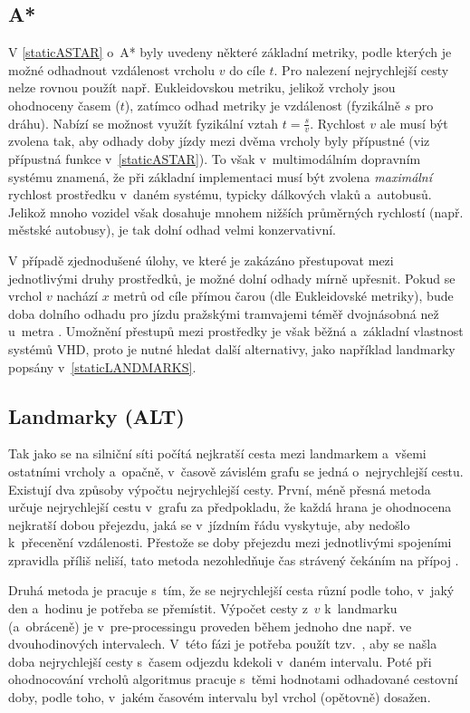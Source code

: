 \subsection{A* }
V \autoref{staticASTAR} o~A* byly uvedeny některé základní metriky, podle kterých je možné odhadnout vzdálenost vrcholu $v$ do cíle $t$. Pro nalezení nejrychlejší cesty nelze rovnou použít např. Eukleidovskou metriku, jelikož vrcholy jsou ohodnoceny časem (\(t\)), zatímco odhad metriky je vzdálenost (fyzikálně \(s\) pro dráhu). Nabízí se možnost využít fyzikální vztah $t = \frac{s}{v}$. Rychlost \(v\) ale musí být zvolena tak, aby odhady doby jízdy mezi dvěma vrcholy byly přípustné (viz přípustná funkce v~\autoref{staticASTAR}). To však v~multimodálním dopravním systému znamená, že při základní implementaci musí být zvolena \emph{maximální} rychlost prostředku v~daném systému, typicky dálkových vlaků a~autobusů. Jelikož mnoho vozidel však dosahuje mnohem nižších průměrných rychlostí (např. městské autobusy), je tak dolní odhad velmi konzervativní.

\renewcommand{\subsectionautorefname}{pododdíle}
V případě zjednodušené úlohy, ve které je zakázáno přestupovat mezi jednotlivými druhy prostředků, je možné dolní odhady mírně upřesnit. Pokud se vrchol $v$ nachází $x$ metrů od cíle přímou čarou (dle Eukleidovské metriky), bude doba dolního odhadu pro jízdu pražskými tramvajemi téměř dvojnásobná než u~metra \cite{DPPvDatech}. Umožnění přestupů mezi prostředky je však běžná a~základní vlastnost systémů VHD, proto je nutné hledat další alternativy, jako například landmarky popsány v~\autoref{staticLANDMARKS}.
\renewcommand{\subsectionautorefname}{pododdíl}

\subsection{Landmarky (ALT)}
Tak jako se na silniční síti počítá nejkratší cesta mezi landmarkem a~všemi ostatními vrcholy a~opačně, v~časově závislém grafu se jedná o~nejrychlejší cestu. Existují dva způsoby výpočtu nejrychlejší cesty. První, méně přesná metoda určuje nejrychlejší cestu v~grafu za předpokladu, že každá hrana je ohodnocena nejkratší dobou přejezdu, jaká se v~jízdním řádu vyskytuje, aby nedošlo k~přecenění vzdálenosti. Přestože se doby přejezdu mezi jednotlivými spojeními zpravidla příliš neliší, tato metoda nezohledňuje čas strávený čekáním na přípoj \cite{dellingLandmarkRouting}.

Druhá metoda je pracuje s~tím, že se nejrychlejší cesta různí podle toho, v~jaký den a~hodinu je potřeba se přemístit. Výpočet cesty z~$v$ k~landmarku (a~obráceně) je v~pre-processingu proveden během jednoho dne např. ve dvouhodinových intervalech. V~této fázi je potřeba použít tzv.~, aby se našla doba nejrychlejší cesty s~časem odjezdu kdekoli v~daném intervalu. Poté při ohodnocování vrcholů algoritmus pracuje s~těmi hodnotami odhadované cestovní doby, podle toho, v~jakém časovém intervalu byl vrchol (opětovně) dosažen.

